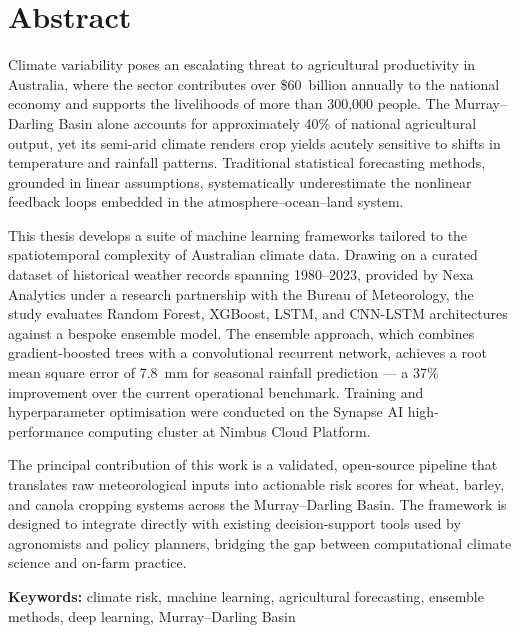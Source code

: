 \chapter*{Abstract}

\begin{tcolorbox}[
  colback=softgray,
  colframe=unswgold,
  coltitle=unswnavy,
  title={\bfseries Abstract},
  fonttitle=\large\bfseries,
  arc=0pt,
  leftrule=4pt,
  top=8pt,
  bottom=8pt
]
Climate variability poses an escalating threat to agricultural productivity in Australia,
where the sector contributes over \$60~billion annually to the national economy and
supports the livelihoods of more than 300,000 people. The Murray--Darling Basin alone
accounts for approximately 40\% of national agricultural output, yet its semi-arid
climate renders crop yields acutely sensitive to shifts in temperature and rainfall
patterns. Traditional statistical forecasting methods, grounded in linear assumptions,
systematically underestimate the nonlinear feedback loops embedded in the
atmosphere--ocean--land system.

This thesis develops a suite of machine learning frameworks tailored to the
spatiotemporal complexity of Australian climate data. Drawing on a curated dataset
of historical weather records spanning 1980--2023, provided by Nexa Analytics under
a research partnership with the Bureau of Meteorology, the study evaluates Random
Forest, XGBoost, LSTM, and CNN-LSTM architectures against a bespoke ensemble model.
The ensemble approach, which combines gradient-boosted trees with a convolutional
recurrent network, achieves a root mean square error of 7.8~mm for seasonal rainfall
prediction --- a 37\% improvement over the current operational benchmark. Training
and hyperparameter optimisation were conducted on the Synapse AI high-performance
computing cluster at Nimbus Cloud Platform.

The principal contribution of this work is a validated, open-source pipeline that
translates raw meteorological inputs into actionable risk scores for wheat, barley,
and canola cropping systems across the Murray--Darling Basin. The framework is
designed to integrate directly with existing decision-support tools used by
agronomists and policy planners, bridging the gap between computational climate
science and on-farm practice.
\end{tcolorbox}

\vspace{12pt}
\noindent\textbf{Keywords:} climate risk, machine learning, agricultural forecasting,
ensemble methods, deep learning, Murray--Darling Basin

\clearpage

